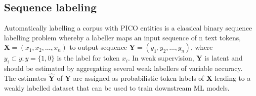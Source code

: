 \documentclass[10.7pt,]{article}
\begin{document}
\subsection{Sequence labeling}\label{seq_lab}
%
Automatically labelling a corpus with PICO entities is a classical binary sequence labelling problem whereby a labeller maps an input sequence of n text tokens, $ \bm{X} = (x_{1}, x_{2}, \dotso , x_{n} )$ to output sequence $\bm{Y} = (y_{1}, y_{2}, \dotso , y_{n} )$, where $y_{i} \subset y; y = \{1,0\} $ is the label for token $x_{i}$.
In weak supervision, $\bm{Y}$ is latent and should be estimated by aggregating several weak labellers of variable accuracy.
The estimates $\bm{\hat{Y}}$ of $\bm{Y}$ are assigned as probabilistic token labels of $\bm{X}$ leading to a weakly labelled dataset that can be used to train downstream ML models.
%
%
%
\end{document}

